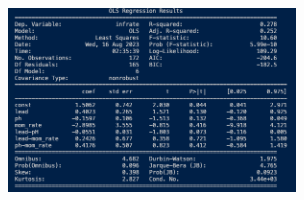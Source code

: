 \documentclass{uofa-eng-assignment}
\begin{document}
\begin{enumerate}
\begin{enumerate}
\begin{figure}[h]
                \end{figure}
                \begin{figure}[h]
                    \centering
                    \includegraphics[width=0.68\textwidth]{p1-c-ii.png}
                \end{figure} \clearpage
        \end{enumerate}
\end{enumerate}
\end{document}
